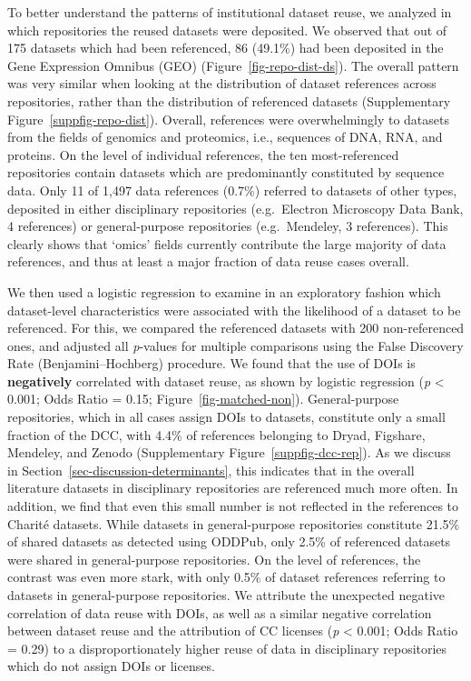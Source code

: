 \documentclass[
  letterpaper,
  DIV=11,
  numbers=noendperiod]{scrartcl}
\begin{document}
To better understand the patterns of institutional dataset reuse, we
analyzed in which repositories the reused datasets were deposited. We
observed that out of 175 datasets which had been referenced, 86 (49.1\%)
had been deposited in the Gene Expression Omnibus (GEO)
(Figure~\ref{fig-repo-dist-ds}). The overall pattern was very similar
when looking at the distribution of dataset references across
repositories, rather than the distribution of referenced datasets
(Supplementary Figure~\ref{suppfig-repo-dist}). Overall, references were
overwhelmingly to datasets from the fields of genomics and proteomics,
i.e., sequences of DNA, RNA, and proteins. On the level of individual
references, the ten most-referenced repositories contain datasets which
are predominantly constituted by sequence data. Only 11 of 1,497 data
references (0.7\%) referred to datasets of other types, deposited in
either disciplinary repositories (e.g.~Electron Microscopy Data Bank, 4
references) or general-purpose repositories (e.g.~Mendeley, 3
references). This clearly shows that `omics' fields currently contribute
the large majority of data references, and thus at least a major
fraction of data reuse cases overall.

\newpage

We then used a logistic regression to examine in an exploratory fashion
which dataset-level characteristics were associated with the likelihood
of a dataset to be referenced. For this, we compared the referenced
datasets with 200 non-referenced ones, and adjusted all \emph{p}-values
for multiple comparisons using the False Discovery Rate
(Benjamini--Hochberg) procedure. We found that the use of DOIs is
\textbf{negatively} correlated with dataset reuse, as shown by logistic
regression (\emph{p} \textless{} 0.001; Odds Ratio = 0.15;
Figure~\ref{fig-matched-non}). General-purpose repositories, which in
all cases assign DOIs to datasets, constitute only a small fraction of
the DCC, with 4.4\% of references belonging to Dryad, Figshare,
Mendeley, and Zenodo (Supplementary Figure~\ref{suppfig-dcc-rep}). As we
discuss in Section~\ref{sec-discussion-determinants}, this indicates
that in the overall literature datasets in disciplinary repositories are
referenced much more often. In addition, we find that even this small
number is not reflected in the references to Charité datasets. While
datasets in general-purpose repositories constitute 21.5\% of shared
datasets as detected using ODDPub, only 2.5\% of referenced datasets
were shared in general-purpose repositories. On the level of references,
the contrast was even more stark, with only 0.5\% of dataset references
referring to datasets in general-purpose repositories. We attribute the
unexpected negative correlation of data reuse with DOIs, as well as a
similar negative correlation between dataset reuse and the attribution
of CC licenses (\emph{p} \textless{} 0.001; Odds Ratio = 0.29) to a
disproportionately higher reuse of data in disciplinary repositories
which do not assign DOIs or licenses.
\end{document}
